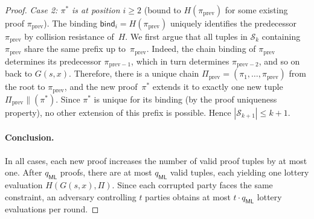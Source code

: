 \begin{proof}
\emph{Case 2: $\pi^*$ is at position $i \geq 2$} (bound to $H(\pi_{\mathrm{prev}})$ for some existing proof $\pi_{\mathrm{prev}}$). The binding $\mathsf{bind}_i = H(\pi_{\mathrm{prev}})$ uniquely identifies the predecessor $\pi_{\mathrm{prev}}$ by collision resistance of~$H$. We first argue that all tuples in $\mathcal{S}_k$ containing $\pi_{\mathrm{prev}}$ share the same prefix up to~$\pi_{\mathrm{prev}}$. Indeed, the chain binding of $\pi_{\mathrm{prev}}$ determines its predecessor $\pi_{\mathrm{prev}-1}$, which in turn determines $\pi_{\mathrm{prev}-2}$, and so on back to $G(s,x)$. Therefore, there is a unique chain $\Pi_{\mathrm{prev}} = (\pi_1, \ldots, \pi_{\mathrm{prev}})$ from the root to $\pi_{\mathrm{prev}}$, and the new proof~$\pi^*$ extends it to exactly one new tuple $\Pi_{\mathrm{prev}} \| (\pi^*)$. Since $\pi^*$ is unique for its binding (by the proof uniqueness property), no other extension of this prefix is possible. Hence $|\mathcal{S}_{k+1}| \leq k + 1$.

\paragraph{Conclusion.}
In all cases, each new proof increases the number of valid proof tuples by at most one. After $q_{\mathsf{ML}}$ proofs, there are at most $q_{\mathsf{ML}}$ valid tuples, each yielding one lottery evaluation $H(G(s,x), \Pi)$. Since each corrupted party faces the same constraint, an adversary controlling $t$ parties obtains at most $t \cdot q_{\mathsf{ML}}$ lottery evaluations per round.
\end{proof}


